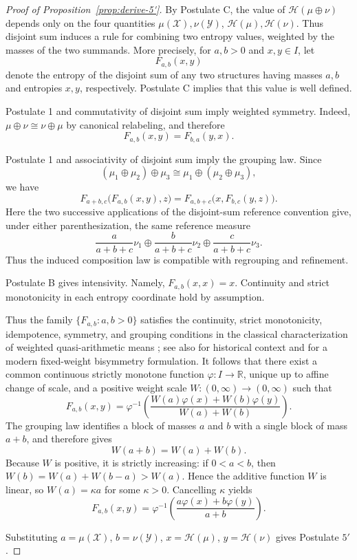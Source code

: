 \documentclass[reqno]{amsart}
\begin{document}
\begin{proof}[Proof of Proposition~\ref{prop:derive-5'}]
By Postulate C, the value of $\mathcal H(\mu \oplus \nu)$
depends only on the four quantities
$\mu(\mathcal X),
\nu(\mathcal Y)$,
$\mathcal H(\mu),
\mathcal H(\nu)$.
Thus disjoint sum induces a rule for combining two entropy values, weighted
by the masses of the two summands. More precisely, for $a,b>0$ and
$x,y\in I$, let
$$
F_{a,b}(x,y)
$$
denote the entropy of the disjoint sum of any two structures having masses
$a,b$ and entropies $x,y$, respectively. Postulate C implies that this
value is well defined.

Postulate 1 and commutativity of disjoint sum imply weighted symmetry.
Indeed, $\mu\oplus\nu\cong\nu\oplus\mu$ by canonical relabeling, and therefore
$$
F_{a,b}(x,y)=F_{b,a}(y,x).
$$

Postulate 1 and associativity of disjoint sum imply the grouping law. Since
$$
(\mu_1\oplus\mu_2)\oplus\mu_3
\cong
\mu_1\oplus(\mu_2\oplus\mu_3),
$$
we have
$$
F_{a+b,c}\bigl(F_{a,b}(x,y),z\bigr)
=
F_{a,b+c}\bigl(x,F_{b,c}(y,z)\bigr).
$$
Here the two successive applications of the disjoint-sum reference
convention give, under either parenthesization, the same reference measure
$$
\frac{a}{a+b+c}\nu_1
\oplus
\frac{b}{a+b+c}\nu_2
\oplus
\frac{c}{a+b+c}\nu_3.
$$
Thus the induced composition law is compatible with regrouping and
refinement.

Postulate B gives intensivity. Namely, $F_{a,b}(x,x)=x$.
Continuity and strict monotonicity in each entropy coordinate hold by
assumption.

Thus the family $\{F_{a,b}:a,b>0\}$ satisfies the continuity, strict
monotonicity, idempotence, symmetry, and grouping conditions in the
classical characterization of weighted quasi-arithmetic means
\cite{Kitagawa34}; see also \cite[p.~392]{Aczel48} for historical
context and \cite[Theorem~4]{GrabischEtAl11} for a modern fixed-weight
bisymmetry formulation. It follows that there exist a common continuous
strictly monotone function $\varphi:I\to\mathbb R$, unique up to affine change of scale, and a positive weight
scale $W:(0,\infty)\to(0,\infty)$ such that
$$
F_{a,b}(x,y)
=
\varphi^{-1}
\left(
\frac{W(a)\varphi(x)+W(b)\varphi(y)}
{W(a)+W(b)}
\right).
$$
The grouping law identifies a block of masses $a$ and $b$ with a single
block of mass $a+b$, and therefore gives
$$
W(a+b)=W(a)+W(b).
$$
Because $W$ is positive, it is strictly increasing: if $0<a<b$, then
$W(b)=W(a)+W(b-a)>W(a)$. Hence the additive function $W$ is linear,
so $W(a)=\kappa a$ for some $\kappa>0$. Cancelling $\kappa$ yields
$$
F_{a,b}(x,y)
=
\varphi^{-1}
\left(
\frac{a\varphi(x)+b\varphi(y)}
{a+b}
\right).
$$

Substituting
$
a=\mu(\mathcal{X})$, $b=\nu(\mathcal{Y})$, $
x=\mathcal{H}(\mu)$, $y=\mathcal{H}(\nu)$ gives Postulate $5'$.
\end{proof}
\end{document}
